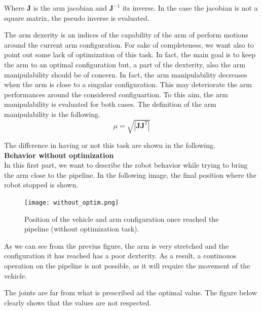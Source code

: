 \documentclass{article}
\begin{document}
Where $\bm{J}$ is the arm jacobian and $\bm{J}^{-1}$ its inverse. In the case the jacobian is not a square matrix, the pseudo inverse is evaluated. 

The arm dexerity is an indices of the capability of the arm of perform motions around the current arm configuration. 
For sake of completeness, we want also to point out some lack of optimization of this task. In fact, the main goal is to keep the arm to an optimal configuration but, a part of the dexterity, also the arm manipulability should be of concern. In fact, the arm manipulability decreases when the arm is close to a singular configuration. This may deteriorate the arm performances around the considered configuartion. To this aim, the arm manipulability is evaluated for both cases. The definition of the arm manipulability is the following. 
$$
	\mu = \sqrt{\left| \bm{J} \bm{J}^T \right|}
$$

The difference in having or not this task are shown in the following. \\

{\large \textbf{Behavior without optimization}} \\
In this first part, we want to describe the robot behavior while trying to bring the arm close to the pipeline. In the following image, the final position where the robot stopped is shown. \\


\begin{figure}[H]
	\centering
	{\texttt{[image: without\_optim.png]}}
	\caption{Position of the vehicle and arm configuration once reached the pipeline (without optimization task).}
	\label{im:without_optim}
\end{figure}



As we can see from the previus figure, the arm is very stretched and the configuration it has reached has a poor dexterity. As a result, a continouos operation on the pipeline is not possible, as it will require the movement of the vehicle. 

The joints are far from what is prescribed ad the optimal value. The figure below clearly shows that the values are not respected. 

\begin{figure}[H]
	\centering
	\hspace{10mm}
	\hspace{10mm}
	\label{im:Without_optim_results}
\end{figure} 
\end{document}
